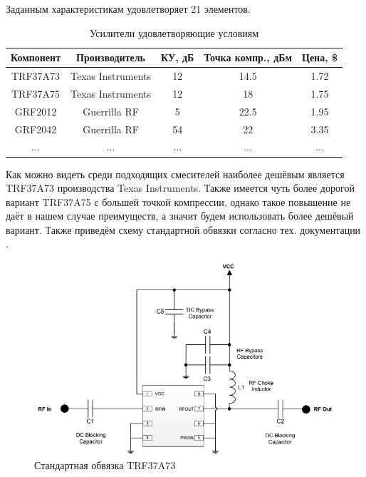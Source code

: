 \documentclass[utf8x, 14pt, oneside, a4paper]{article}
\begin{document}
				\vspace{\baselineskip}
				
				Заданным характеристикам удовлетворяет 21 элементов.
				
				\begin{table}[H]	
					\centering
					\begin{tabular}{|c|c|c|c|c|}
						\hline
						Компонент & Производитель & КУ, дБ & Точка компр., дБм & Цена, \$ \\
						\hline
						TRF37A73 & Texas Instruments & 12 & 14.5 & 1.72 \\
						\hline
						TRF37A75 & Texas Instruments & 12 & 18 & 1.75 \\
						\hline
						GRF2012 & Guerrilla RF & 5 & 22.5 & 1.95\\
						\hline
						GRF2042 & Guerrilla RF & 54 & 22 & 3.35 \\
						\hline
						... & ... & ... & ... & ... \\
						\hline
					\end{tabular}
					\caption{Усилители удовлетворяющие условиям}
					\label{table:Amp1}
				\end{table}
				
				Как можно видеть среди подходящих смесителей наиболее дешёвым является TRF37A73 производства Texas Instruments. Также имеется чуть более дорогой вариант TRF37A75 с большей точкой компрессии, однако такое повышение не даёт в нашем случае преимуществ, а значит будем использовать более дешёвый вариант. Также приведём схему стандартной обвязки согласно тех. документации \cite{bib:docs:TRF37A73}.
				
				\begin{figure}[H]
					\centering
					\includegraphics[width=0.7\linewidth]{"Рисунки/Доки/TRF37A73"}
					\caption{Стандартная обвязка TRF37A73}
					\label{fig:doc:TRF37A73}
				\end{figure}
			
\end{document}
